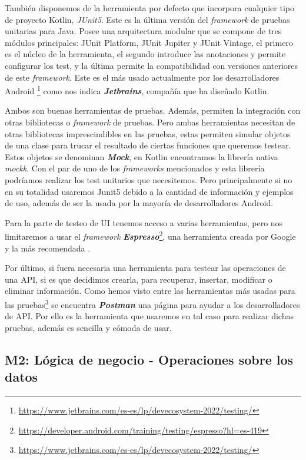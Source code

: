 También disponemos de la herramienta por defecto que incorpora cualquier tipo de proyecto Kotlin, 
\textit{JUnit5}. Este es la última versión del \textit{framework} de pruebas unitarias para Java. Posee 
una arquitectura modular que se compone de tres módulos principales: JUnit Platform, JUnit Jupiter y 
JUnit Vintage, el primero es el núcleo de la herramienta, el segundo introduce las anotaciones y 
permite configurar los test, y la última permite la compatibilidad con versiones anteriores de este 
\textit{framework}. Este es el más usado actualmente por los desarrolladores Android 
\footnote{\url{https://www.jetbrains.com/es-es/lp/devecosystem-2022/testing/}} como nos indica 
\textbf{\textit{Jetbrains}}, compañía que ha diseñado Kotlin.

Ambos son buenas herramientas de pruebas. Además, permiten la integración con otras bibliotecas o 
\textit{framework} de pruebas. Pero ambas herramientas necesitan de otras bibliotecas imprescindibles 
en las pruebas, estas permiten simular objetos de una clase para trucar el resultado de ciertas 
funciones que queremos testear. Estos objetos se denominan \textbf{\textit{Mock}}, en Kotlin 
encontramos la librería nativa \textit{mockk}. Con el par de uno de los \textit{frameworks} mencionados 
y esta librería podríamos realizar los test unitarios que necesitemos. Pero principalmente si no en su 
totalidad usaremos Junit5 debido a la cantidad de información y ejemplos de uso, además de ser la usada 
por la mayoría de desarrolladores Android.

Para la parte de testeo de UI tenemos acceso a varias herramientas, pero nos limitaremos a usar el 
\textit{framework} 
\textbf{\textit{Espresso}}\footnote{\url{https://developer.android.com/training/testing/espresso?hl=es-419}}, una herramienta creada por Google y la más recomendada \cite{UITest}.

Por último, si fuera necesaria una herramienta para testear las operaciones de una API, si es que decidimos 
crearla, para  recuperar, insertar, modificar o eliminar información. Como hemos visto entre las 
herramientas más usadas para las pruebas\footnote{\url{https://www.jetbrains.com/es-es/lp/devecosystem-2022/testing/}} se encuentra \textit{\textbf{Postman}} una página para ayudar a los desarrolladores de 
API. Por ello es la herramienta que usaremos en tal caso para realizar dichas pruebas, además es 
sencilla y cómoda de usar.

\subsection{M2: Lógica de negocio - Operaciones sobre los datos}

